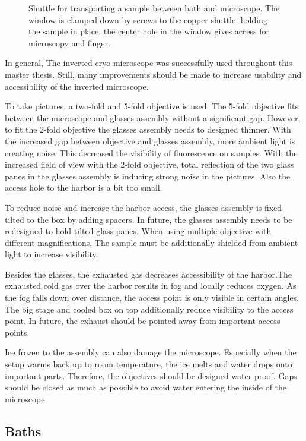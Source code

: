 \begin{figure}[hbt!]
	\centering
	
	\caption{Shuttle for transporting a sample between bath and microscope. The window is clamped down by screws to the copper shuttle, holding the sample in place. the center hole in the window gives access for microscopy and finger.}
	\label{fig:shuttle}
\end{figure}

In general, The inverted cryo microscope was successfully used throughout this master thesis. Still, many improvements should be made to increase usability and accessibility of the inverted microscope. 

To take pictures, a two-fold and 5-fold objective is used. The 5-fold objective fits between the microscope and glasses assembly without a significant gap. However, to fit the 2-fold objective the glasses assembly needs to designed thinner. With the increased gap between objective and glasses assembly, more ambient light is creating noise. This decreased the visibility of fluorescence on samples. With the increased field of view with the 2-fold objective, total reflection of the two glass panes in the glasses assembly is inducing strong noise in the pictures. Also the access hole to the harbor is a bit too small. 

To reduce noise and increase the harbor access, the glasses assembly is fixed tilted to the box by adding spacers. In future, the glasses assembly needs to be redesigned to hold tilted glass panes. When using multiple objective with different magnifications, The sample must be additionally shielded from ambient light to increase visibility.

Besides the glasses, the exhausted gas decreases accessibility of the harbor.The exhausted cold gas over the harbor results in fog and locally reduces oxygen. As the fog falls down over distance, the access point is only visible in certain angles.
The big stage and cooled box on top additionally reduce visibility to the access point. In future, the exhaust should be pointed away from important access points.

Ice frozen to the assembly can also damage the microscope. Especially when the setup warms back up to room temperature, the ice melts and water drops onto important parts. Therefore, the objectives should be designed water proof. Gaps should be closed as much as possible to avoid water entering the inside of the microscope.

\subsection{Baths}

